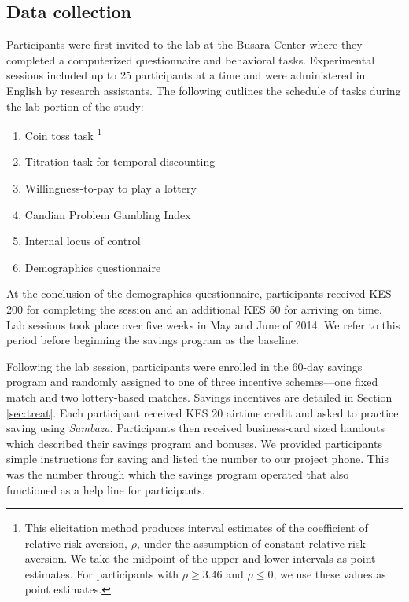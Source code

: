 \documentclass[11pt]{article}
\begin{document}
	\subsection{Data collection}

		Participants were first invited to the lab at the Busara Center where they completed a computerized questionnaire and behavioral tasks. Experimental sessions included up to 25 participants at a time and were administered in English by research assistants. The following outlines the schedule of tasks during the lab portion of the study:

		\begin{enumerate} \setlength{\itemsep}{1pt}
		\item Coin toss task \footnote{This elicitation method produces interval estimates of the coefficient of relative risk aversion, $\rho$, under the assumption of constant relative risk aversion. We take the midpoint of the upper and lower intervals as point estimates. For participants with $\rho \geq 3.46$ and $\rho \leq 0$, we use these values as point estimates.}
		\item Titration task for temporal discounting 
		\item Willingness-to-pay to play a lottery
		\item Candian Problem Gambling Index 
		\item Internal locus of control 
		\item Demographics questionnaire
		\end{enumerate}


		At the conclusion of the demographics questionnaire, participants received KES 200 for completing the session and an additional KES 50 for arriving on time. Lab sessions took place over five weeks in May and June of 2014. We refer to this period before beginning the savings program as the baseline.

		Following the lab session, participants were enrolled in the 60-day savings program and randomly assigned to one of three incentive schemes---one fixed match and two lottery-based matches. Savings incentives are detailed in Section \ref{sec:treat}. Each participant received KES 20 airtime credit and asked to practice saving using \textit{Sambaza}. Participants then received business-card sized handouts which described their savings program and bonuses. We provided participants simple instructions for saving and listed the number to our project phone. This was the number through which the savings program operated that also functioned as a help line for participants.
\end{document}
